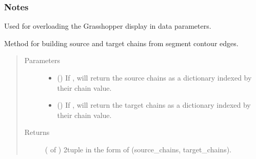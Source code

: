 \documentclass[letterpaper,10pt,english]{sphinxmanual}
\begin{document}
\begin{fulllineitems}
\begin{fulllineitems}
\begin{quote}
\begin{description}
\end{description}\end{quote}
\subsubsection*{Notes}

Used for overloading the Grasshopper display in data parameters.

\end{fulllineitems}


\begin{fulllineitems}
\label{\detokenize{cockatoo:cockatoo.KnitMappingNetwork.build_chains}}
Method for building source and target chains from segment
contour edges.
\begin{quote}\begin{description}
\item[{Parameters}] \leavevmode\begin{itemize}
\item {} 
 () \textendash{} If , will return the source chains as a dictionary indexed
by their chain value.

\item {} 
 () \textendash{} If , will return the target chains as a dictionary indexed
by their chain value.

\end{itemize}

\item[{Returns}] \leavevmode
{} ( of ) \textendash{} 2\sphinxhyphen{}tuple in the form of (source\_chains, target\_chains).


\end{description}
\end{quote}
\end{fulllineitems}
\end{fulllineitems}
\end{document}
